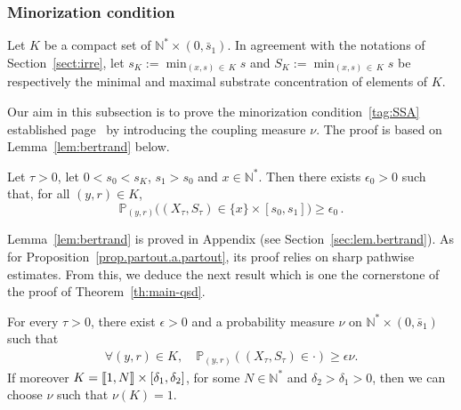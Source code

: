 \documentclass[AHL,Unicode,longabstracts,published]{cedram}
\newcommand{\llbracket}{\mathopen{[\mkern -2.7mu[}}
\newcommand{\rrbracket}{\mathclose{]\mkern -2.7mu]}}
\newcommand{\PP}{\mathbb{P}}
\newcommand{\NN}{\mathbb{N}}
\newcommand{\1}{\mathbf{1}}
\let\oldforall\forall
\renewcommand*{\forall}{\mathrel{\oldforall}}
\begin{document}
\subsubsection{Minorization condition}\label{sec:small.set}


Let $K$ be a compact set of $\NN^*\times (0,\bar s_1)$. In agreement with the notations of Section~\ref{sect:irre}, let $s_K:=\min_{(x,s)\,\in\,K}s$ and $S_K:=\min_{(x,s)\,\in\,K}s$ be respectively the minimal and maximal substrate concentration of elements of $K$.

Our aim in this subsection is to prove the minorization condition~\eqref{tag:SSA} established page~\pageref{tag:SSA} by introducing the coupling measure $\nu$. The proof is based on Lemma~\ref{lem:bertrand} below.

\begin{lemm}\label{lem:bertrand}
Let $\tau>0$, let $0<s_0<s_K$, $s_1>s_0$ and $x\in \NN^*$. Then there exists $\epsilon_0>0$ such that, for all $(y,r)\in K$,
\[
\PP_{(y,r)}\big((X_{\tau},S_{\tau})\in \{x\}\times [s_0,s_1]\big) \geq \epsilon_0\,.
\]
\end{lemm}

Lemma~\ref{lem:bertrand} is proved in Appendix (see Section~\ref{sec:lem.bertrand}). As for Proposition~\ref{prop.partout.a.partout}, its proof relies on sharp pathwise estimates. From this, we deduce the next result which is one the cornerstone of the proof of Theorem~\ref{th:main-qsd}.

\begin{lemm}\label{lem:smallset}
For every $\tau>0$, there exist $\epsilon>0$ and a probability measure $\nu$ on $\NN^*\times (0,\bar s_1)$ such that
\begin{align}\label{eq:smallset}
\forall (y,r) \in K, \quad \PP_{(y,r)}\left((X_\tau, S_\tau) \in \cdot \right)\geq \epsilon \nu.
\end{align}
If moreover $K = \llbracket 1, N \rrbracket \times [\delta_1, \delta_2]$, for some $N \in \NN^*$ and $\delta_2>\delta_1>0$, then we can choose $\nu$ such that $\nu(K)=1$.
\end{lemm}
\end{document}
